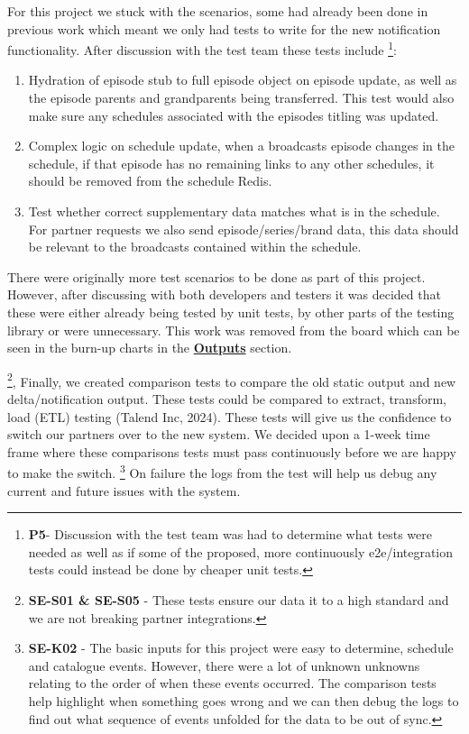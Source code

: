   For this project we stuck with the scenarios, some had already been done in previous work which meant we only had tests to write for the new 
  notification functionality. After discussion with the test team these tests include
  \footnote{\textbf{P5}- Discussion with the test team was had to determine what tests were needed as well as if some of the proposed, more continuously
  e2e/integration tests could instead be done by cheaper unit tests.}:

  \begin{enumerate}
    \item Hydration of episode stub to full episode object on episode update, as well as the episode parents and grandparents being transferred. This
    test would also make sure any schedules associated with the episodes titling was updated.
    \item Complex logic on schedule update, when a broadcasts episode changes in the schedule, if that episode has no remaining links to any other 
    schedules, it should be removed from the schedule Redis.
    \item Test whether correct supplementary data matches what is in the schedule. For partner requests we also send episode/series/brand data, 
    this data should be relevant to the broadcasts contained within the schedule.
  \end{enumerate}

  There were originally more test scenarios to be done as part of this project. However, after discussing with both developers and testers it was decided 
  that these were either already being tested by unit tests, by other parts of the testing library or were unnecessary. This work was removed from 
  the board which can be seen in the burn-up charts in the \hyperref[sec:burnup]{\textbf{Outputs}} section.

  \footnote{\textbf{SE-S01 \& SE-S05} - These tests ensure our data it to a high standard and we are not breaking partner integrations.}, 
  Finally, we created comparison tests to compare the old static output and new delta/notification output. These tests could be compared to extract, transform, 
  load (ETL) testing (Talend Inc, 2024). These tests will give us the confidence to switch our partners over to the new system. We decided upon a 1-week time 
  frame where these comparisons tests must pass continuously before we are happy to make the switch. 
  \footnote{\textbf{SE-K02} - The basic inputs for this project were easy to determine, schedule and catalogue events. However, there were a lot of unknown unknowns 
  relating to the order of when these events occurred. The comparison tests help highlight when something goes wrong and we can then debug the logs to 
  find out what sequence of events unfolded for the data to be out of sync.}
  On failure the logs from the test will help us debug any current and future issues with the system.

  \newpage